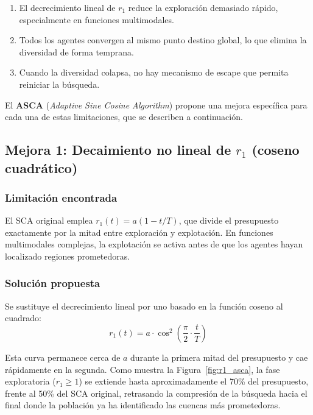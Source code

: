 \documentclass[12pt,a4paper]{article}
\begin{document}
\begin{enumerate}
  \item El decrecimiento lineal de $r_1$ reduce la exploración demasiado rápido, especialmente en funciones multimodales.
  \item Todos los agentes convergen al mismo punto destino global, lo que elimina la diversidad de forma temprana.
  \item Cuando la diversidad colapsa, no hay mecanismo de escape que permita reiniciar la búsqueda.
\end{enumerate}
 
El \textbf{ASCA} (\textit{Adaptive Sine Cosine Algorithm}) propone una mejora específica para cada una de estas limitaciones, que se describen a continuación.
 
\subsection{Mejora 1: Decaimiento no lineal de $r_1$ (coseno cuadrático)}
 
\subsubsection{Limitación encontrada}
 
El SCA original emplea $r_1(t) = a(1 - t/T)$, que divide el presupuesto exactamente por la mitad entre exploración y explotación. En funciones multimodales complejas, la explotación se activa antes de que los agentes hayan localizado regiones prometedoras.
 
\subsubsection{Solución propuesta}
 
Se sustituye el decrecimiento lineal por uno basado en la función coseno al cuadrado:
\begin{equation}
  r_1(t) = a \cdot \cos^2\!\left(\frac{\pi}{2} \cdot \frac{t}{T}\right)
  \label{eq:r1_asca}
\end{equation}
 
Esta curva permanece cerca de $a$ durante la primera mitad del presupuesto y cae rápidamente en la segunda. Como muestra la Figura~\ref{fig:r1_asca}, la fase exploratoria ($r_1 \geq 1$) se extiende hasta aproximadamente el 70\% del presupuesto, frente al 50\% del SCA original, retrasando la compresión de la búsqueda hacia el final donde la población ya ha identificado las cuencas más prometedoras.
 
\end{document}
